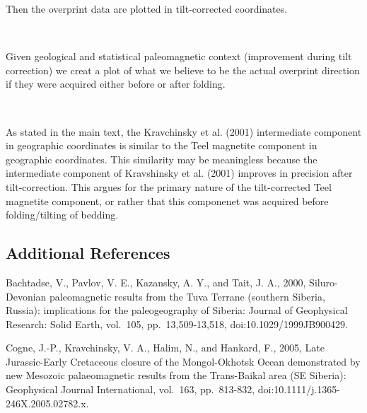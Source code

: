 \documentclass[11pt]{article}
\begin{document}
    Then the overprint data are plotted in tilt-corrected coordinates.


    \begin{center}
    \end{center}
    { \hspace*{\fill} \\}
    
    Given geological and statistical paleomagnetic context (improvement
during tilt correction) we creat a plot of what we believe to be the
actual overprint direction if they were acquired either before or after
folding.


    \begin{center}
    \end{center}
    { \hspace*{\fill} \\}
    
    As stated in the main text, the Kravchinsky et al. (2001) intermediate
component in geographic coordinates is similar to the Teel magnetite
component in geographic coordinates. This similarity may be meaningless
because the intermediate component of Kravshinsky et al. (2001) improves
in precision after tilt-correction. This argues for the primary nature
of the tilt-corrected Teel magnetite component, or rather that this
componenet was acquired before folding/tilting of bedding.

    \subsection{Additional References}\label{additional-references}

    Bachtadse, V., Pavlov, V. E., Kazansky, A. Y., and Tait, J. A., 2000,
Siluro-Devonian paleomagnetic results from the Tuva Terrane (southern
Siberia, Russia): implications for the paleogeography of Siberia:
Journal of Geophysical Research: Solid Earth, vol.~105,
pp.~13,509-13,518, doi:10.1029/1999JB900429.

Cogne, J.-P., Kravchinsky, V. A., Halim, N., and Hankard, F., 2005, Late
Jurassic-Early Cretaceous closure of the Mongol-Okhotsk Ocean
demonstrated by new Mesozoic palaeomagnetic results from the
Trans-Baikal area (SE Siberia): Geophysical Journal International,
vol.~163, pp.~813-832, doi:10.1111/j.1365-246X.2005.02782.x.
\end{document}
